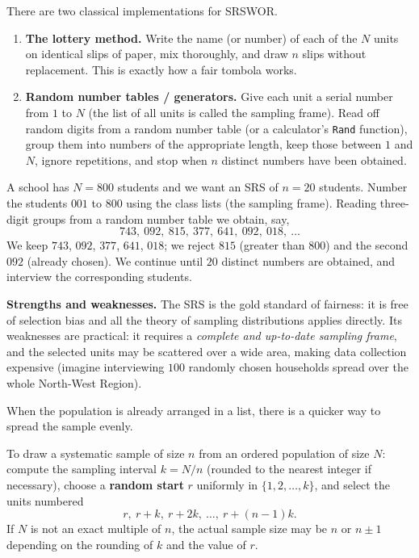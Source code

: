 \documentclass[11pt]{article}
\newcommand{\cle}[1]{{\popxbold\color{popdark}#1}}
\newcounter{popsec}
\newcounter{popsub}
\newcommand{\courssub}[1]{%
  \stepcounter{popsub}%
  \par\vspace{9pt}\noindent{\popxbold\fontsize{11.5}{13}\selectfont\color{popink}{\color{poporange}\thepopsec.\thepopsub}\hspace{6pt}#1}\par\nopagebreak\vspace{4pt}
}
\begin{document}
There are two classical implementations for SRSWOR.

\begin{enumerate}
\item \textbf{The lottery method.} Write the name (or number) of each of the $N$ units on identical slips of paper, mix thoroughly, and draw $n$ slips without replacement. This is exactly how a fair tombola works.
\item \textbf{Random number tables / generators.} Give each unit a serial number from $1$ to $N$ (the list of all units is called the \cle{sampling frame}). Read off random digits from a random number table (or a calculator's \texttt{Rand} function), group them into numbers of the appropriate length, keep those between $1$ and $N$, ignore repetitions, and stop when $n$ distinct numbers have been obtained.
\end{enumerate}

\begin{exemplebox}
A school has $N = 800$ students and we want an SRS of $n = 20$ students. Number the students $001$ to $800$ using the class lists (the sampling frame). Reading three-digit groups from a random number table we obtain, say,
\[ 743,\ 092,\ 815,\ 377,\ 641,\ 092,\ 018,\ \dots \]
We keep $743$, $092$, $377$, $641$, $018$; we reject $815$ (greater than $800$) and the second $092$ (already chosen). We continue until $20$ distinct numbers are obtained, and interview the corresponding students.
\end{exemplebox}

\textbf{Strengths and weaknesses.} The SRS is the gold standard of fairness: it is free of selection bias and all the theory of sampling distributions applies directly. Its weaknesses are practical: it requires a \emph{complete and up-to-date sampling frame}, and the selected units may be scattered over a wide area, making data collection expensive (imagine interviewing $100$ randomly chosen households spread over the whole North-West Region).

\courssub{Systematic Sampling}

When the population is already arranged in a list, there is a quicker way to spread the sample evenly.

\begin{definition}
To draw a \cle{systematic sample} of size $n$ from an ordered population of size $N$: compute the \cle{sampling interval} $k = N/n$ (rounded to the nearest integer if necessary), choose a \textbf{random start} $r$ uniformly in $\{1, 2, \dots, k\}$, and select the units numbered
\[ r,\ r+k,\ r+2k,\ \dots,\ r+(n-1)k. \]
If $N$ is not an exact multiple of $n$, the actual sample size may be $n$ or $n\pm 1$ depending on the rounding of $k$ and the value of $r$.
\end{definition}
\end{document}
